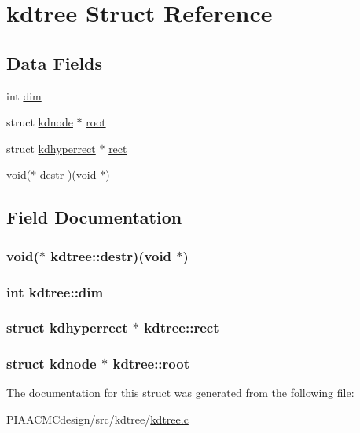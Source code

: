 \hypertarget{structkdtree}{\section{kdtree Struct Reference}
\label{structkdtree}
}
\subsection*{Data Fields}
\begin{DoxyCompactItemize}
\item 
int \hyperlink{structkdtree_a50a985e0d8433bdc599078663b618a83}{dim}
\item 
struct \hyperlink{structkdnode}{kdnode} $\ast$ \hyperlink{structkdtree_add53edae0deda94fc5bb4ad7d73c312e}{root}
\item 
struct \hyperlink{structkdhyperrect}{kdhyperrect} $\ast$ \hyperlink{structkdtree_a7a68c810b84685f548dedb9a8639f895}{rect}
\item 
void($\ast$ \hyperlink{structkdtree_af3b2c55cc7a2e7d7e0f7924a3061014b}{destr} )(void $\ast$)
\end{DoxyCompactItemize}


\subsection{Field Documentation}
\hypertarget{structkdtree_af3b2c55cc7a2e7d7e0f7924a3061014b}{
\subsubsection[{destr}]{\setlength{\rightskip}{0pt plus 5cm}void($\ast$ kdtree\+::destr)(void $\ast$)}}\label{structkdtree_af3b2c55cc7a2e7d7e0f7924a3061014b}
\hypertarget{structkdtree_a50a985e0d8433bdc599078663b618a83}{
\subsubsection[{dim}]{\setlength{\rightskip}{0pt plus 5cm}int kdtree\+::dim}}\label{structkdtree_a50a985e0d8433bdc599078663b618a83}
\hypertarget{structkdtree_a7a68c810b84685f548dedb9a8639f895}{
\subsubsection[{rect}]{\setlength{\rightskip}{0pt plus 5cm}struct {\bf kdhyperrect} $\ast$ kdtree\+::rect}}\label{structkdtree_a7a68c810b84685f548dedb9a8639f895}
\hypertarget{structkdtree_add53edae0deda94fc5bb4ad7d73c312e}{
\subsubsection[{root}]{\setlength{\rightskip}{0pt plus 5cm}struct {\bf kdnode} $\ast$ kdtree\+::root}}\label{structkdtree_add53edae0deda94fc5bb4ad7d73c312e}


The documentation for this struct was generated from the following file\+:\begin{DoxyCompactItemize}
\item 
P\+I\+A\+A\+C\+M\+Cdesign/src/kdtree/\hyperlink{PIAACMCdesign_2src_2kdtree_2kdtree_8c}{kdtree.\+c}\end{DoxyCompactItemize}
